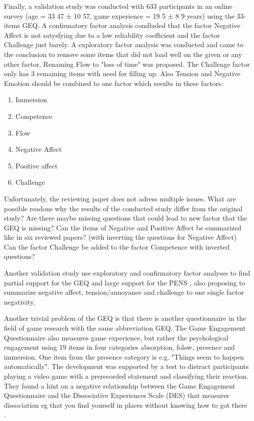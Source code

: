 Finally, a validation study was conducted with 633 participants in an online survey (age = 33 47 ± 10 57, game experience = 19 5 ± 8 9 years) using the 33-items GEQ. A confirmatory factor analysis condluded that the factor Negative Affect is not satysfying due to a low reliability coefficient and the factor Challenge just barely. A exploratory factor analysis was conducted and came to the conclusion to remove some items that did not load well on the given or any other factor. Renaming Flow to "loss of time" was proposed. The Challenge factor only has 3 remaining items with need for filling up. Also Tension and Negative Emotion should be combined to one factor which results in these factors:
\begin{enumerate}
	\item Immersion
	\item Competence
	\item Flow
	\item Negative Affect
	\item Positive affect
	\item Challenge
\end{enumerate}

Unfortunately, the reviewing paper does not adress multiple issues.
What are possible readons why the results of the conducted study differ from the original study?
Are there maybe missing questions that could lead to new factor that the GEQ is missing?
Can the items of Negative and Positive Affect be summarized like in six reviewed papers? (with inverting the questions for Negative Affect)
Can the factor Challenge be added to the factor Competence with inverted questions?

Another validation study use exploratory and confirmatory factor analyses to find partial support for the GEQ and large support for the PENS \cite{johnson2018validation}, also proposing to summarize negative affect, tension/annoyance and challenge to one single factor negativity.
	
Another trivial problem of the GEQ is that there is another questionnaire in the field of game research with the same abbreviation GEQ. The Game Engagement Questionnaire also measures game experience, but rather the psychological engagement \cite{brockmyer2009development} using 19 items in four categories absorption, folow, presence and immersion. One item from the presence category is e.g. "Things seem to happen automatically". The development was supported by a test to distract participants playing a video game with a prerecorded statement and classifying their reaction. They found a hint on a negative relationship between the Game Engagement Questionnaire and the Dissociative Experiences Scale (DES) that measures dissociation eg that you find yourself in places without knowing how to got there \cite{wright1999measuring}.

